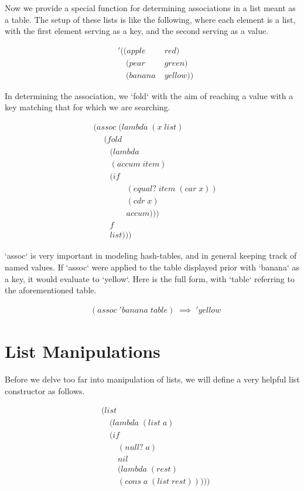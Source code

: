 Now we provide a special function for determining associations in a list meant as 
a table. The setup of these lists is like the following, where each element is a 
list, with the first element serving as a key, and the second serving as a value.

\begin{align*}
& '((apple \; &red)
\\& \quad (pear \; &green)
\\& \quad (banana \; &yellow))
\end{align*}

In determining the association, we `fold` with the aim of reaching a value with a 
key matching that for which we are searching.

\begin{align*}
& (assoc \; (lambda \; (x \; list)
\\& \quad \; (fold \; 
\\& \qquad (lambda \; 
\\& \qquad (accum \; item) \; 
\\& \qquad (if \; 
\\& \qquad \qquad (equal? \; item \; (car \; x))
\\& \qquad \qquad (cdr \; x)
\\& \qquad \qquad accum)))
\\& \qquad f
\\& \qquad list)))
\end{align*}

`assoc` is very important in modeling hash-tables, and in general keeping track of 
named values. If `assoc` were applied to the table displayed prior with `banana` 
as a key, it would evaluate to `yellow`. Here is the full form, with `table` 
referring to the aforementioned table.

\begin{align*}
& (assoc \; 'banana \; table) \; \implies \; 'yellow
\end{align*}

\section{List Manipulations}
Before we delve too far into manipulation of lists, we will define a very helpful 
list constructor as follows.

\begin{align*}
& (list \; 
\\& \quad (lambda \; (list \; a) \; 
\\& \quad (if
\\& \qquad (null? \; a)
\\& \qquad nil
\\& \qquad (lambda \; (rest)
\\& \qquad (cons \; a \; (list \; rest)))))
\end{align*}

